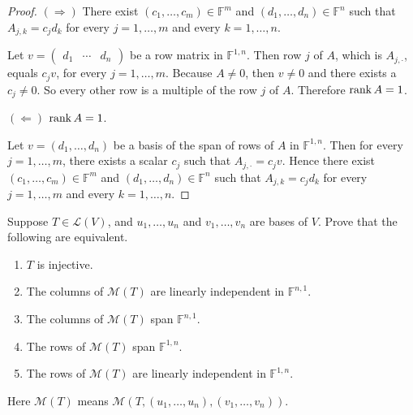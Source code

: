 \begin{proof}
    $(\Rightarrow)$ There exist $(c_{1}, \ldots, c_{m})\in\mathbb{F}^{m}$ and $(d_{1}, \ldots, d_{n})\in\mathbb{F}^{n}$ such that $A_{j,k} = c_{j}d_{k}$ for every $j = 1, \ldots, m$ and every $k = 1, \ldots, n$.

    Let $v = \begin{pmatrix}d_{1} & \cdots & d_{n}\end{pmatrix}$ be a row matrix in $\mathbb{F}^{1,n}$. Then row $j$ of $A$, which is $A_{j,\cdot}$, equals $c_{j} v$, for every $j = 1, \ldots, m$. Because $A\ne 0$, then $v\ne 0$ and there exists a $c_{j}\ne 0$. So every other row is a multiple of the row $j$ of $A$. Therefore $\operatorname{rank}{A} = 1$.

    $(\Leftarrow)$ $\operatorname{rank}{A} = 1$.

    Let $v = (d_{1}, \ldots, d_{n})$ be a basis of the span of rows of $A$ in $\mathbb{F}^{1,n}$. Then for every $j = 1, \ldots, m$, there exists a scalar $c_{j}$ such that $A_{j,\cdot} = c_{j}v$. Hence there exist $(c_{1}, \ldots, c_{m})\in\mathbb{F}^{m}$ and $(d_{1}, \ldots, d_{n})\in\mathbb{F}^{n}$ such that $A_{j,k} = c_{j}d_{k}$ for every $j = 1, \ldots, m$ and every $k = 1, \ldots, n$.
\end{proof}
\newpage

\begin{exercise}
    Suppose $T\in \mathcal{L}(V)$, and $u_{1}, \ldots, u_{n}$ and $v_{1}, \ldots, v_{n}$ are bases of $V$. Prove that the following are equivalent.
    \begin{enumerate}[label={(\alph*)}]
        \item $T$ is injective.
        \item The columns of $\mathcal{M}(T)$ are linearly independent in $\mathbb{F}^{n,1}$.
        \item The columns of $\mathcal{M}(T)$ span $\mathbb{F}^{n,1}$.
        \item The rows of $\mathcal{M}(T)$ span $\mathbb{F}^{1,n}$.
        \item The rows of $\mathcal{M}(T)$ are linearly independent in $\mathbb{F}^{1,n}$.
    \end{enumerate}

    Here $\mathcal{M}(T)$ means $\mathcal{M}(T, (u_{1}, \ldots, u_{n}), (v_{1}, \ldots, v_{n}))$.
\end{exercise}

